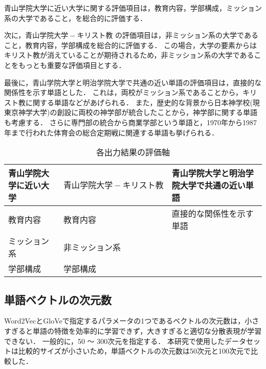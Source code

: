 青山学院大学に近い大学に関する評価項目は，教育内容，学部構成，ミッション系の大学であること，を総合的に評価する．

次に，$ 青山学院大学 - キリスト教 $ の評価項目は，非ミッション系の大学であること，教育内容，学部構成を総合的に評価する．
この場合，大学の要素からはキリスト教が消えていることが期待されるため，非ミッション系の大学であることをもっとも重要な評価項目とする．

最後に，青山学院大学と明治学院大学で共通の近い単語の評価項目は，直接的な関係性を示す単語とした．
これは，両校がミッション系であることから，キリスト教に関する単語などがあげられる．
また，歴史的な背景から日本神学校(現 東京神学大学)の創設に両校の神学部が統合したことから，神学部に関する単語も考慮する．
さらに専門部の統合から商業学部という単語と，1970年から1987年まで行われた体育会の総合定期戦に関連する単語も挙げられる．

\begin{table}[htbp]
\caption{各出力結果の評価軸}
\centering
\begin{tabular}{|l|l|l|}
\hline
青山学院大学に近い大学 & $ 青山学院大学 - キリスト教 $ & 青山学院大学と明治学院大学で共通の近い単語
\\ \hline \hline
教育内容& 教育内容 & 直接的な関係性を示す単語 \\
ミッション系& 非ミッション系 & \\
学部構成 & 学部構成 & \\ \hline
\end{tabular}
\label{table:eval}
\end{table}


\subsection{単語ベクトルの次元数}
Word2VecとGloVeで指定するパラメータの1つであるベクトルの次元数は，小さすぎると単語の特徴を効率的に学習できず，大きすぎると適切な分散表現が学習できない．
一般的に，50 〜 300次元を指定する．
本研究で使用したデータセットは比較的サイズが小さいため，単語ベクトルの次元数は50次元と100次元で比較した．

